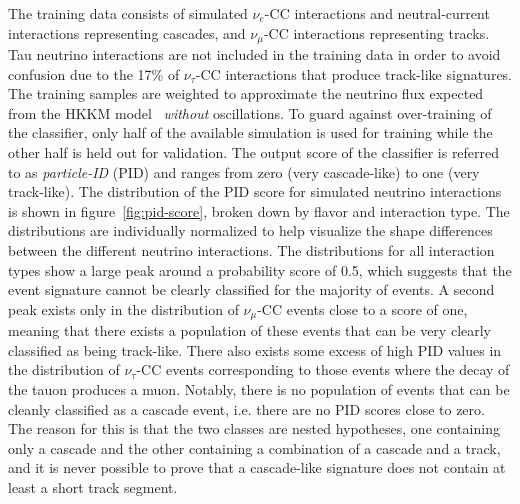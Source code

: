 The training data consists of simulated $\nu_e$-CC interactions and neutral-current interactions representing cascades, and $\nu_\mu$-CC interactions representing tracks. Tau neutrino interactions are not included in the training data in order to avoid confusion due to the 17\% of $\nu_\tau$-CC interactions that produce track-like signatures. The training samples are weighted to approximate the neutrino flux expected from the HKKM model~ \emph{without} oscillations. To guard against over-training of the classifier, only half of the available simulation is used for training while the other half is held out for validation. The output score of the classifier is referred to as \emph{particle-ID} (PID) and ranges from zero (very cascade-like) to one (very track-like). The distribution of the PID score for simulated neutrino interactions is shown in figure~\ref{fig:pid-score}, broken down by flavor and interaction type. The distributions are individually normalized to help visualize the shape differences between the different neutrino interactions. The distributions for all interaction types show a large peak around a probability score of 0.5, which suggests that the event signature cannot be clearly classified for the majority of events. A second peak exists only in the distribution of $\nu_\mu$-CC events close to a score of one, meaning that there exists a population of these events that can be very clearly classified as being track-like. There also exists some excess of high PID values in the distribution of $\nu_\tau$-CC events corresponding to those events where the decay of the tauon produces a muon. Notably, there is no population of events that can be cleanly classified as a cascade event, i.e. there are no PID scores close to zero. The reason for this is that the two classes are nested hypotheses, one containing only a cascade and the other containing a combination of a cascade and a track, and it is never possible to prove that a cascade-like signature does not contain at least a short track segment.
